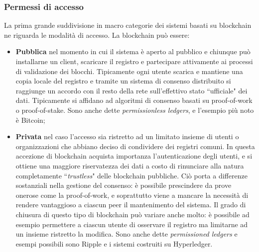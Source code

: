		\subsubsection{Permessi di accesso}
			La prima grande suddivisione in macro categorie dei sistemi basati su blockchain ne riguarda le modalità di accesso. La blockchain può essere:
			\begin{itemize}
				\item \textbf{Pubblica} nel momento in cui il sistema è aperto al pubblico e chiunque può installarne un client, scaricare il registro e partecipare attivamente ai processi di validazione dei blocchi. Tipicamente ogni utente scarica e mantiene una copia locale del registro e tramite un sistema di consenso distribuito si raggiunge un accordo con il resto della rete sull'effettivo stato ``ufficiale" dei dati. Tipicamente si affidano ad algoritmi di consenso basati su proof-of-work o proof-of-stake. Sono anche dette \emph{permissionless ledgers}, e l'esempio più noto è Bitcoin;
				\item \textbf{Privata} nel caso l'accesso sia ristretto ad un limitato insieme di utenti o organizzazioni che abbiano deciso di condividere dei registri comuni. In questa accezione di blockchain acquista importanza l'autenticazione degli utenti, e si ottiene una maggiore riservatezza dei dati a costo di rinunciare alla natura completamente ``\emph{trustless}" delle blockchain pubbliche. Ciò porta a differenze sostanziali nella gestione del consenso: è possibile prescindere da prove onerose come la proof-of-work, e soprattutto viene a mancare la necessità di rendere vantaggioso a ciascun peer il mantenimento del sistema.
				Il grado di chiusura di questo tipo di blockchain può variare anche molto: è possibile ad esempio permettere a ciascun utente di osservare il registro ma limitarne ad un insieme ristretto la modifica. Sono anche dette \emph{permissioned ledgers} e esempi possibili sono Ripple e i sistemi costruiti su Hyperledger.
			\end{itemize}
		
